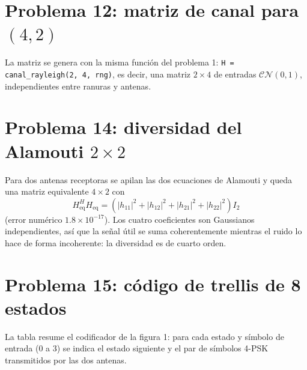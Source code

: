 \documentclass[11pt,a4paper]{article}
\begin{document}
\section*{Problema 12: matriz de canal para $(4,2)$}

La matriz se genera con la misma función del problema 1:
\texttt{H = canal\_rayleigh(2, 4, rng)}, es decir, una matriz $2\times4$ de
entradas $\mathcal{CN}(0,1)$, independientes entre ranuras y antenas.

\section*{Problema 14: diversidad del Alamouti $2\times2$}

Para dos antenas receptoras se apilan las dos ecuaciones de Alamouti y
queda una matriz equivalente $4\times2$ con
\begin{equation}
  H_{\text{eq}}^HH_{\text{eq}}
  =\left(|h_{11}|^2+|h_{12}|^2+|h_{21}|^2+|h_{22}|^2\right)I_2
\end{equation}
(error numérico $1.8\times10^{-17}$). Los cuatro coeficientes son
Gaussianos independientes, así que la señal útil se suma coherentemente
mientras el ruido lo hace de forma incoherente: la diversidad es de cuarto
orden.

\section*{Problema 15: código de trellis de 8 estados}

La tabla resume el codificador de la figura 1: para cada estado y símbolo
de entrada (0 a 3) se indica el estado siguiente y el par de símbolos
4-PSK transmitidos por las dos antenas.
\end{document}
